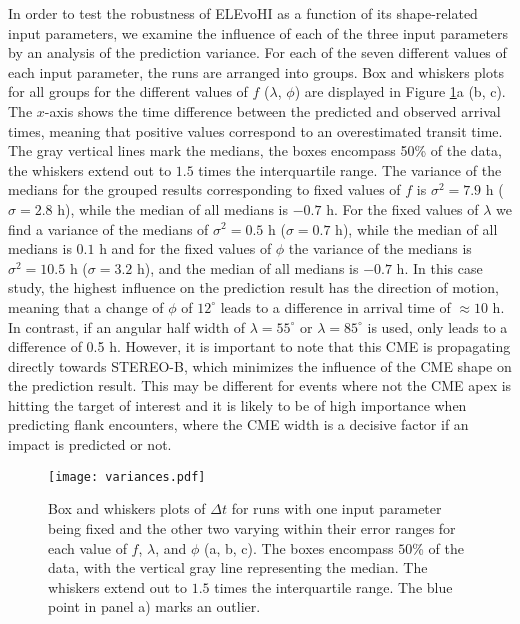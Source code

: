 \documentclass[draft]{agujournal}
\begin{document}
In order to test the robustness of ELEvoHI as a function of its shape-related input parameters, we examine the influence of each of the three input parameters by an analysis of the prediction variance. 
For each of the seven different values of each input parameter, the runs are arranged into groups. Box and whiskers plots for all groups for the different values of $f$ ($\lambda$, $\phi$) are displayed in Figure \ref{fig:dt_all}a (b, c). The $x$-axis shows the time difference between the predicted and observed arrival times, meaning that positive values correspond to an overestimated transit time.
The gray vertical lines mark the medians, the boxes encompass 50\% of the data, the whiskers extend out to $1.5$ times the interquartile range. The variance of the medians for the grouped results corresponding to fixed values of $f$ is $\sigma^2 = 7.9$ h ($\sigma=2.8$ h), while the median of all medians is $-0.7$ h. For the fixed values of $\lambda$ we find a variance of the medians of $\sigma^2 = 0.5$ h ($\sigma=0.7$ h), while the median of all medians is $0.1$ h and for the fixed values of $\phi$ the variance of the medians is $\sigma^2 = 10.5$ h ($\sigma=3.2$ h), and the median of all medians is $-0.7$ h.
In this case study, the highest influence on the prediction result has the direction of motion, meaning that a change of $\phi$ of $12^\circ$ leads to a difference in arrival time of $\approx 10$ h. In contrast, if an angular half width of $\lambda=55^\circ$ or $\lambda=85^\circ$ is used, only leads to a difference of 0.5 h.
However, it is important to note that this CME is propagating directly towards STEREO-B, which minimizes the influence of the CME shape on the prediction result. This may be different for events where not the CME apex is hitting the target of interest and it is likely to be of high importance when predicting flank encounters, where the CME width is a decisive factor if an impact is predicted or not. 

\begin{figure}[h]
\centering
\texttt{[image: variances.pdf]}
\caption{Box and whiskers plots of $\Delta t$ for runs with one input parameter being fixed and the other two varying within their error ranges for each value of $f$, $\lambda$, and $\phi$ (a, b, c). The boxes encompass $50$\% of the data, with the vertical gray line representing the median. The whiskers extend out to $1.5$ times the interquartile range. The blue point in panel a) marks an outlier.}
\label{fig:dt_all}
\end{figure}
\end{document}
